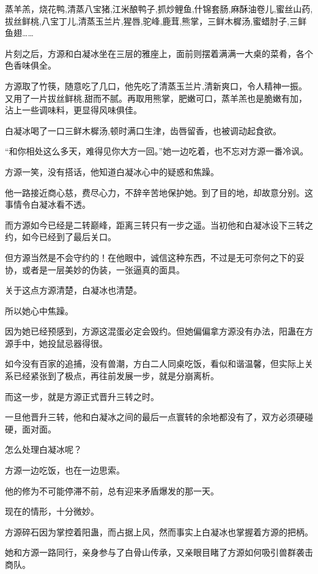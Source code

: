 
\begin{this_body}

蒸羊羔，烧花鸭,清蒸八宝猪,江米酿鸭子,抓炒鲤鱼,什锦套肠,麻酥油卷儿,蜜丝山药,拔丝鲜桃,八宝丁儿,清蒸玉兰片,猩唇,驼峰,鹿茸,熊掌，三鲜木樨汤,蜜蜡肘子,三鲜鱼翅……

片刻之后，方源和白凝冰坐在三层的雅座上，面前则摆着满满一大桌的菜肴，各个色香味俱全。

方源取了竹筷，随意吃了几口，他先吃了清蒸玉兰片,清新爽口，令人精神一振。又用了一片拔丝鲜桃,甜而不腻。再取用熊掌，肥嫩可口，蒸羊羔也是脆嫩有加，沾上一些调味料，更显得风味俱佳。

白凝冰喝了一口三鲜木樨汤,顿时满口生津，齿唇留香，也被调动起食欲。

“和你相处这么多天，难得见你大方一回。”她一边吃着，也不忘对方源一番冷讽。

方源一笑，没有搭话，他知道白凝冰心中的疑惑和焦躁。

他一路接近商心慈，费尽心力，不辞辛苦地保护她。到了目的地，却故意分别。这事情令白凝冰看不透。

而方源如今已经是二转巅峰，距离三转只有一步之遥。当初他和白凝冰设下三转之约，如今已经到了最后关口。

但方源当然是不会守约的！在他眼中，诚信这种东西，不过是无可奈何之下的妥协，或者是一层美妙的伪装，一张逼真的面具。

关于这点方源清楚，白凝冰也清楚。

所以她心中焦躁。

因为她已经预感到，方源这混蛋必定会毁约。但她偏偏拿方源没有办法，阳蛊在方源手中，她投鼠忌器得很。

如今没有百家的追捕，没有兽潮，方白二人同桌吃饭，看似和谐温馨，但实际上关系已经紧张到了极点，再往前发展一步，就是分崩离析。

而这一步，就是方源正式晋升三转之时。

一旦他晋升三转，他和白凝冰之间的最后一点寰转的余地都没有了，双方必须硬碰硬，面对面。

怎么处理白凝冰呢？

方源一边吃饭，也在一边思索。

他的修为不可能停滞不前，总有迎来矛盾爆发的那一天。

现在的情形，十分微妙。

方源碎石因为掌控着阳蛊，而占据上风，然而事实上白凝冰也掌握着方源的把柄。

她和方源一路同行，亲身参与了白骨山传承，又亲眼目睹了方源如何吸引兽群袭击商队。


\end{this_body}
